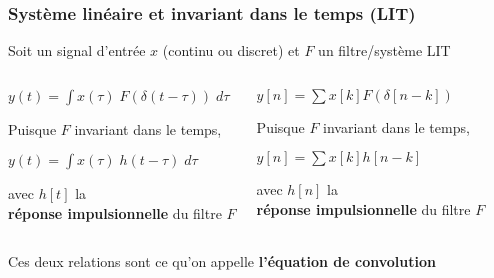 \documentclass{beamer}
\begin{document}
\begin{frame} 
\frametitle{Système linéaire et invariant dans le temps (LIT) }
Soit un signal d'entrée $x$ (continu ou discret) et $F$ un filtre/système LIT\\
\vspace{1 cm}
\begin{columns}
\column{65mm}
\begin{center}
$y(t) = \displaystyle \int x(\tau) \; F(\delta(t-\tau) ) \;d\tau$\\
\vspace{0.5cm}

Puisque $F$ invariant dans le temps,\\
\vspace{0.5cm}

$y(t) = \displaystyle \int x(\tau) \; h(t-\tau) \; d\tau$\\
\vspace{0.5cm}

avec $h[t]$ la\\ \textbf{réponse impulsionnelle} du filtre $F$

\end{center}

\column{55mm}
\begin{center}

$ y[n] = \displaystyle\sum x[k]  F(\delta[n-k]) $ \\
\vspace{0.5cm}

Puisque $F$ invariant dans le temps,\\
\vspace{0.5cm}

$ y[n] = \displaystyle\sum x[k]  h[n-k] $ \\
\vspace{0.5cm}

avec $h[n]$ la\\ \textbf{réponse impulsionnelle} du filtre $F$

\end{center}
\end{columns}
\begin{block}{}
Ces deux relations sont ce qu'on appelle \textbf{l'équation de convolution}
\end{block}
\end{frame}
\end{document}
